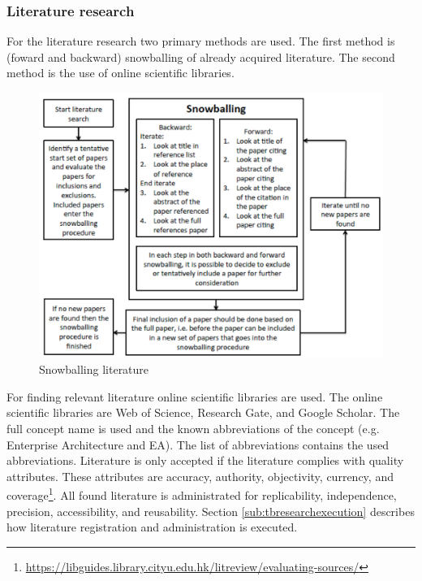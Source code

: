 \subsubsection{Literature research}
For the literature research two primary methods are used. The first method is (foward and backward) snowballing of already acquired literature. The second method is the use of online scientific libraries.

\begin{figure}[H]
	\centering
	\includegraphics[width=0.6\linewidth]{images/snowball}
	\caption[Snowballing literature]{Snowballing literature \parencite{Wohlin2014}}
	\label{fig:snowball}
\end{figure}
For finding relevant literature online scientific libraries are used. The online scientific libraries are Web of Science, Research Gate, and Google Scholar. The full concept name is used and the known abbreviations of the concept (e.g. Enterprise Architecture and EA). The list of abbreviations contains the used abbreviations. Literature is only accepted if the literature complies with quality attributes. These attributes are accuracy, authority, objectivity, currency, and coverage\footnote{\url{https://libguides.library.cityu.edu.hk/litreview/evaluating-sources/}}. All found literature is administrated for replicability, independence, precision, accessibility, and reusability. Section \ref{sub:tbresearchexecution} describes how literature registration and administration is executed.

